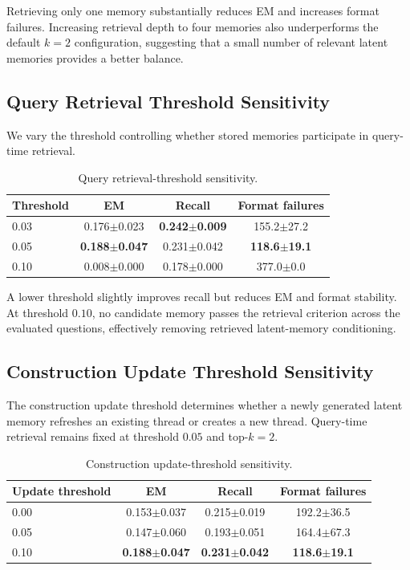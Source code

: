 \documentclass[letterpaper]{article}
\begin{document}
Retrieving only one memory substantially reduces EM and increases format
failures. Increasing retrieval depth to four memories also underperforms the
default \(k=2\) configuration, suggesting that a small number of relevant
latent memories provides a better balance.


\subsection{Query Retrieval Threshold Sensitivity}
\label{sec:supp-threshold}

We vary the threshold controlling whether stored memories participate in
query-time retrieval.

\begin{table}[t]
\centering
\begin{tabular}{lccc}
\toprule
Threshold & EM & Recall & Format failures\\
\midrule
0.03 &
0.176$\pm$0.023 &
\textbf{0.242$\pm$0.009} &
155.2$\pm$27.2\\

0.05 &
\textbf{0.188$\pm$0.047} &
0.231$\pm$0.042 &
\textbf{118.6$\pm$19.1}\\

0.10 &
0.008$\pm$0.000 &
0.178$\pm$0.000 &
377.0$\pm$0.0\\
\bottomrule
\end{tabular}
\caption{Query retrieval-threshold sensitivity.}
\label{tab:supp-threshold}
\end{table}


A lower threshold slightly improves recall but reduces EM and format
stability. At threshold \(0.10\), no candidate memory passes the retrieval
criterion across the evaluated questions, effectively removing retrieved
latent-memory conditioning.

\subsection{Construction Update Threshold Sensitivity}
\label{sec:supp-update-threshold}

The construction update threshold determines whether a newly generated latent
memory refreshes an existing thread or creates a new thread. Query-time
retrieval remains fixed at threshold \(0.05\) and top-\(k=2\).

\begin{table}[t]
\centering
\begin{tabular}{lccc}
\toprule
Update threshold & EM & Recall & Format failures\\
\midrule
0.00 &
0.153$\pm$0.037 &
0.215$\pm$0.019 &
192.2$\pm$36.5\\

0.05 &
0.147$\pm$0.060 &
0.193$\pm$0.051 &
164.4$\pm$67.3\\

0.10 &
\textbf{0.188$\pm$0.047} &
\textbf{0.231$\pm$0.042} &
\textbf{118.6$\pm$19.1}\\
\bottomrule
\end{tabular}
\caption{Construction update-threshold sensitivity.}
\label{tab:supp-update-threshold}
\end{table}
\end{document}

